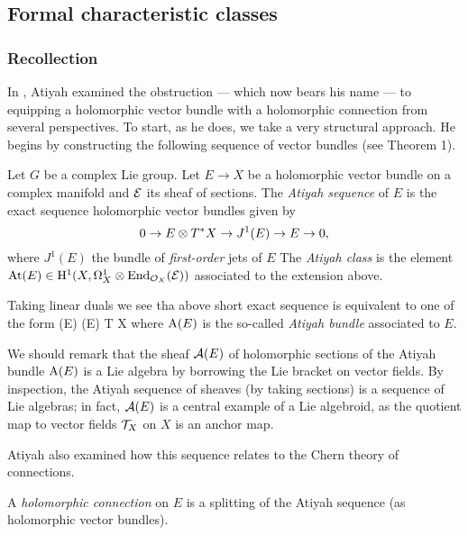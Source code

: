 \subsection{Formal characteristic classes}

\subsubsection{Recollection}

In \cite{atiyah}, Atiyah examined the obstruction --- which now bears his name --- to equipping a holomorphic vector bundle with a holomorphic connection from several perspectives. To start, as he does, we take a very structural approach. He begins by constructing the following sequence of vector bundles (see Theorem 1).

\begin{dfn}
Let $G$ be a complex Lie group. Let $E \to X$ be a holomorphic vector
bundle on a complex manifold and $\mathcal E$ its sheaf of sections. The {\em Atiyah sequence} of $E$ is the
exact sequence holomorphic vector bundles given by
\[
0 \to E \otimes T^* X \to J^1(E) \to E \to 0,
\]
where $J^1(E)$ the bundle of {\em first-order} jets of $E$
The {\em Atiyah class} is the element ${\rm At}(E) \in {\rm H}^1(X, \Omega^1_X
\otimes {\rm End}_{\mathcal O_X} (\mathcal E))$ associated to the extension above. 
\end{dfn}

\begin{rmk}
Taking linear duals we see tha above short exact sequence is
equivalent to one of the form
 \to \End (E) (E) \to T X 
\een
where ${\rm A}(E)$ is the so-called {\em Atiyah bundle} associated to $E$. 

We should remark that the sheaf $\mathcal{A}(E)$ of holomorphic sections of the Atiyah bundle ${\rm A}(E)$ is a Lie algebra by borrowing the Lie bracket on vector fields.
By inspection, the Atiyah sequence of sheaves (by taking sections) is a sequence of Lie algebras; 
 in fact, $\mathcal{A}(E)$ is a central example of a Lie algebroid, as the quotient map to vector fields $\mathcal T_X$ on $X$ is an anchor map.
\end{rmk}

Atiyah also examined how this sequence relates to the Chern theory of connections.

\begin{prop} 
A {\em holomorphic connection} on $E$ is a splitting of the Atiyah sequence (as holomorphic vector bundles).
\end{prop}

